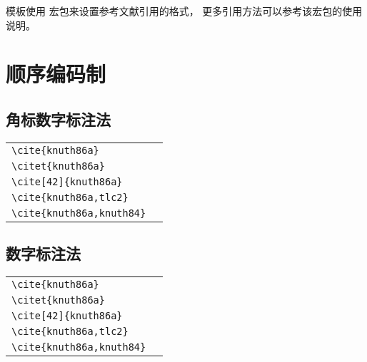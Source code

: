

模板使用  宏包来设置参考文献引用的格式，
更多引用方法可以参考该宏包的使用说明。



\section{顺序编码制}

\subsection{角标数字标注法}

\noindent
\begin{tabular}{l@{\quad$\Rightarrow$\quad}l}
  \verb|\cite{knuth86a}|         & \cite{knuth86a}         \\
  \verb|\citet{knuth86a}|        & \citet{knuth86a}        \\
  \verb|\cite[42]{knuth86a}|     & \cite[42]{knuth86a}     \\
  \verb|\cite{knuth86a,tlc2}|    & \cite{knuth86a,tlc2}    \\
  \verb|\cite{knuth86a,knuth84}| & \cite{knuth86a,knuth84} \\
\end{tabular}


\subsection{数字标注法}

\noindent
\begin{tabular}{l@{\quad$\Rightarrow$\quad}l}
  \verb|\cite{knuth86a}|         & \cite{knuth86a}         \\
  \verb|\citet{knuth86a}|        & \citet{knuth86a}        \\
  \verb|\cite[42]{knuth86a}|     & \cite[42]{knuth86a}     \\
  \verb|\cite{knuth86a,tlc2}|    & \cite{knuth86a,tlc2}    \\
  \verb|\cite{knuth86a,knuth84}| & \cite{knuth86a,knuth84} \\
\end{tabular}



